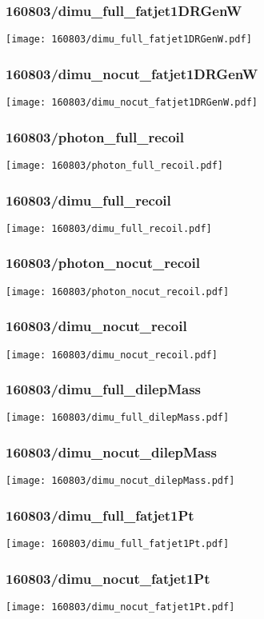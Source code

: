 \begin{frame}
   \frametitle{\small 160803/dimu\_full\_fatjet1DRGenW}
   \centering
   \texttt{[image: 160803/dimu\_full\_fatjet1DRGenW.pdf]}
\end{frame}

\begin{frame}
   \frametitle{\small 160803/dimu\_nocut\_fatjet1DRGenW}
   \centering
   \texttt{[image: 160803/dimu\_nocut\_fatjet1DRGenW.pdf]}
\end{frame}

\begin{frame}
   \frametitle{\small 160803/photon\_full\_recoil}
   \centering
   \texttt{[image: 160803/photon\_full\_recoil.pdf]}
\end{frame}

\begin{frame}
   \frametitle{\small 160803/dimu\_full\_recoil}
   \centering
   \texttt{[image: 160803/dimu\_full\_recoil.pdf]}
\end{frame}

\begin{frame}
   \frametitle{\small 160803/photon\_nocut\_recoil}
   \centering
   \texttt{[image: 160803/photon\_nocut\_recoil.pdf]}
\end{frame}

\begin{frame}
   \frametitle{\small 160803/dimu\_nocut\_recoil}
   \centering
   \texttt{[image: 160803/dimu\_nocut\_recoil.pdf]}
\end{frame}

\begin{frame}
   \frametitle{\small 160803/dimu\_full\_dilepMass}
   \centering
   \texttt{[image: 160803/dimu\_full\_dilepMass.pdf]}
\end{frame}

\begin{frame}
   \frametitle{\small 160803/dimu\_nocut\_dilepMass}
   \centering
   \texttt{[image: 160803/dimu\_nocut\_dilepMass.pdf]}
\end{frame}

\begin{frame}
   \frametitle{\small 160803/dimu\_full\_fatjet1Pt}
   \centering
   \texttt{[image: 160803/dimu\_full\_fatjet1Pt.pdf]}
\end{frame}

\begin{frame}
   \frametitle{\small 160803/dimu\_nocut\_fatjet1Pt}
   \centering
   \texttt{[image: 160803/dimu\_nocut\_fatjet1Pt.pdf]}
\end{frame}

